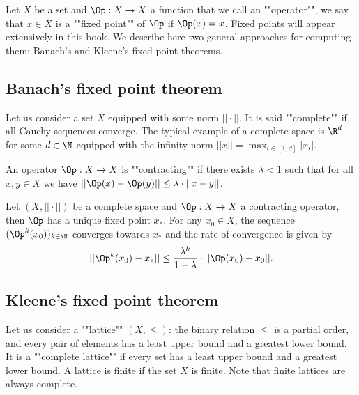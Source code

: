 Let $X$ be a set and $\Op : X \to X$ a function that we call an ""operator"", we say that $x \in X$ is a ""fixed point"" of $\Op$ if $\Op(x) = x$.
Fixed points will appear extensively in this book. 
We describe here two general approaches for computing them: Banach's and Kleene's fixed point theorems.

\subsection*{Banach's fixed point theorem}
Let us consider a set $X$ equipped with some norm $||\cdot||$.
It is said ""complete"" if all Cauchy sequences converge.
The typical example of a complete space is $\R^d$ for some $d \in \N$ equipped with the infinity norm $||x|| = \max_{i \in [1,d]} |x_i|$.

An operator $\Op : X \to X$ is ""contracting"" if there exists $\lambda < 1$ such that for all $x,y \in X$ we have
$||\Op(x) - \Op(y)|| \le \lambda \cdot ||x - y||$.

\begin{theorem}
\label{1-thm:banach}
Let $(X,||\cdot||)$ be a complete space and $\Op : X \to X$ a contracting operator, then $\Op$ has a unique fixed point $x_*$.
For any $x_0 \in X$, the sequence $(\Op^k(x_0))_{k \in \N}$ converges towards $x_*$ and the rate of convergence is given by
\[
||\Op^k(x_0) - x_*|| \le \frac{\lambda^k}{1 - \lambda} \cdot ||\Op(x_0) - x_0||.
\]
\end{theorem}

%

\subsection*{Kleene's fixed point theorem}
Let us consider a ""lattice"" $(X,\le)$: the binary relation $\le$ is a partial order, and every pair of elements has a least upper bound and a greatest lower bound. It is a ""complete lattice"" if every set has a least upper bound and a greatest lower bound.
A lattice is finite if the set $X$ is finite.
Note that finite lattices are always complete.

